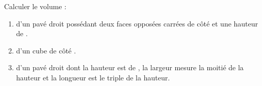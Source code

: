 \begin{exercice}
   Calculer le volume :
   \begin{enumerate}
      \item d'un pavé droit possédant deux faces opposées carrées de côté  et une hauteur de .
      \item d'un cube de côté .
      \item d'un pavé droit dont la hauteur est de , la largeur mesure la moitié de la hauteur et la longueur est le triple de la hauteur.
   \end{enumerate}
\end{exercice}
